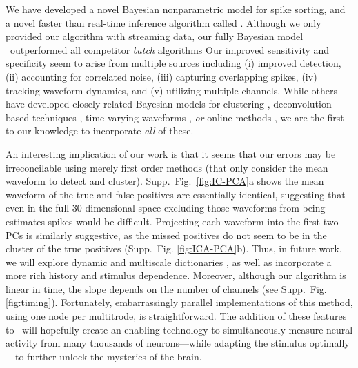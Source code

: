 
We have developed a novel Bayesian nonparametric model for spike sorting, and a novel faster than real-time  inference algorithm called \smug.  
Although we only provided our algorithm with streaming data, our fully Bayesian model \smug\ outperformed all competitor \emph{batch} algorithms 
Our improved sensitivity and specificity seem to arise from multiple sources including (i) improved detection, (ii) accounting for correlated noise, 
(iii) capturing overlapping spikes, (iv) tracking waveform dynamics, and (v) utilizing multiple channels.  
While others have developed closely related Bayesian models for clustering \cite{WoodBla2008,wood2009}, deconvolution based techniques \cite{Pillow2013}, time-varying waveforms \cite{calabrese2011kalman},  \emph{or} online methods \cite{OSORT, Franke2010}, we are the first to our knowledge to incorporate \emph{all} of these.

An interesting implication of our work is that it seems that our errors may be irreconcilable using merely first order methods (that 
only consider the mean waveform to detect and cluster).  Supp.\ Fig.\ \ref{fig:IC-PCA}a shows the mean waveform 
of the true and false positives are essentially identical, suggesting that even in the full 30-dimensional space excluding those waveforms from being 
estimates spikes would be difficult.  
Projecting each waveform into the first two PCs is similarly suggestive,
as the missed positives do not seem to be in the cluster of the true positives (Supp.\ Fig. \ref{fig:ICA-PCA}b). 
Thus, in future work, we will explore dynamic and multiscale dictionaries \cite{ChenMaggioni12}, 
as well as incorporate a more rich history and stimulus dependence.  
Moreover, although our algorithm is linear in time, the slope depends on the number of channels (see Supp.\ Fig. \ref{fig:timing}).  
Fortunately, embarrassingly parallel implementations of this method, using one node per multitrode, is straightforward.  
The addition of these features to \smug\ will hopefully create an enabling technology to  simultaneously measure neural activity from many thousands of neurons---while adapting the stimulus optimally---to further unlock the mysteries of the brain.






